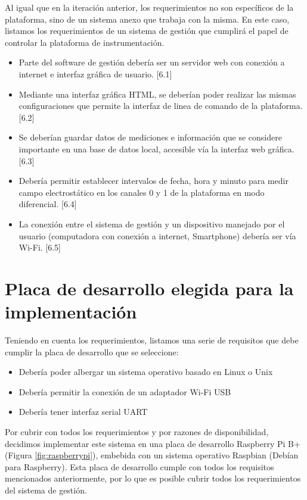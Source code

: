 Al igual que en la iteración anterior, los requerimientos no son específicos de la plataforma, sino de un sistema anexo que trabaja con la misma. En este caso, listamos los requerimientos de un sistema de gestión que cumplirá el papel de controlar la plataforma de instrumentación.

\begin{itemize}
\item Parte del software de gestión debería ser un servidor web con conexión a internet e interfaz gráfica de usuario. [6.1]
\item Mediante una interfaz gráfica HTML, se deberían poder realizar las mismas configuraciones que permite la interfaz de linea de comando de la plataforma. [6.2]
\item Se deberían guardar datos de mediciones e información que se considere importante en una base de datos local, accesible vía la interfaz web gráfica. [6.3]
\item Debería permitir establecer intervalos de fecha, hora y minuto para medir campo electrostático en los canales 0 y 1 de la plataforma en modo diferencial. [6.4]
\item La conexión entre el sistema de gestión y un dispositivo manejado por el usuario (computadora con conexión a internet, Smartphone) debería ser vía Wi-Fi. [6.5]
\end{itemize}



\section{Placa de desarrollo elegida para la implementación} %
\label{it7:sec:placa_de_desarrollo_elegida_para_la_implementacion}

Teniendo en cuenta los requerimientos, listamos una serie de requisitos que debe cumplir la placa de desarrollo que se seleccione:

\begin{itemize}
  \item Debería poder albergar un sistema operativo basado en Linux o Unix
  \item Debería permitir la conexión de un adaptador Wi-Fi USB
  \item Debería tener interfaz serial UART
\end{itemize}

Por cubrir con todos los requerimientos y por razones de disponibilidad, decidimos implementar este sistema en una placa de desarrollo Raspberry Pi B+ (Figura \ref{fig:raspberrypi}), embebida con un sistema operativo Raspbian (Debían para Raspberry). Esta placa de desarrollo cumple con todos los requisitos mencionados anteriormente, por lo que es posible cubrir todos los requerimientos del sistema de gestión.

